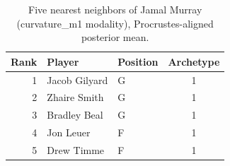\begin{table}[htbp]
  \centering\small
  \begin{tabular}{rllc}
    \toprule
    Rank & Player & Position & Archetype \\
    \midrule
    1 & Jacob Gilyard & G & 1 \\
    2 & Zhaire Smith & G & 1 \\
    3 & Bradley Beal & G & 1 \\
    4 & Jon Leuer & F & 1 \\
    5 & Drew Timme & F & 1 \\
    \bottomrule
  \end{tabular}
  \caption{Five nearest neighbors of Jamal Murray (curvature_m1 modality), Procrustes-aligned posterior mean.}
  \label{tab:Jamal_Murray_neighbors_curvature_m1}
\end{table}

